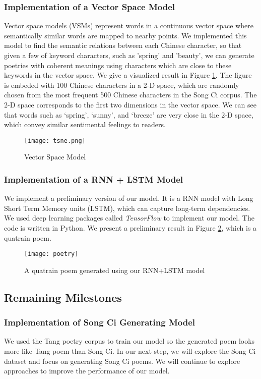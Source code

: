\subsubsection{ Implementation of a Vector Space Model }
Vector space models (VSMs) represent words in a continuous vector space where semantically similar words are mapped to nearby points.
%
We implemented this model to find the semantic relations between each Chinese character, so that given a few of keyword characters, such as 'spring' and 'beauty', we can generate poetries with coherent meanings using characters which are close to these keywords in the vector space.
%
%
We give a visualized result in Figure \ref{fig:VSM}. The figure is embeded with 100 Chinese characters in a 2-D space, which are randomly chosen from the most frequent 500 Chinese characters in the Song Ci corpus. The 2-D space corresponds to the first two dimensions in the vector space. We can see that words such as `spring', `sunny', and `breeze' are very close in the 2-D space, which convey similar sentimental feelings to readers. 


\begin{figure}[htbp]
	\centering
	\texttt{[image: tsne.png]}
	\caption{Vector Space Model}
	\label{fig:VSM}
\end{figure}
\subsubsection{ Implementation of a RNN + LSTM Model  }
We implement a preliminary version of our model. It is a RNN model with Long Short Term Memory units (LSTM), which can capture long-term dependencies. 
%
We used deep learning packages called \emph{TensorFlow} \cite{tensorflow} to implement our model. The code is written in Python.
%
We present a preliminary result in Figure \ref{fig:poetry}, which is a quatrain poem.  
\begin{figure}[htbp]
	\centering
	\texttt{[image: poetry]}
	\caption{A quatrain poem generated using our RNN+LSTM model}
	\label{fig:poetry}
\end{figure}


\subsection{Remaining Milestones}
%
\subsubsection{Implementation of Song Ci Generating Model }
We used the Tang poetry corpus to train our model so the generated poem looks more like Tang poem than Song Ci. 
%
In our next step, we will explore the Song Ci dataset and focus on generating Song Ci poems.
%
We will continue to explore approaches to improve the performance of our model.

